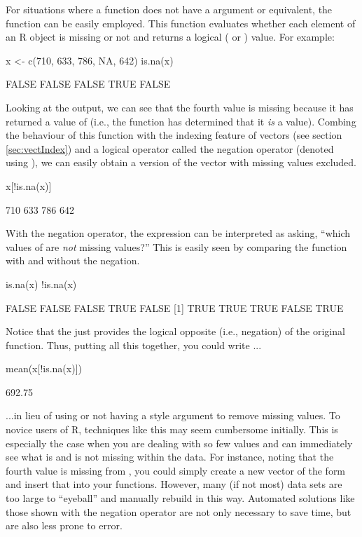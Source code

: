 For situations where a function does not have a  argument or equivalent, the function  can be easily employed. This function evaluates whether each element of an R object is missing or not and returns a logical ( or ) value. For example:

\begin{inR}
x <- c(710, 633, 786, NA, 642)
is.na(x)
\end{inR}
\begin{outR}
[1] FALSE FALSE FALSE TRUE FALSE
\end{outR}

Looking at the output, we can see that the fourth value is missing because it has returned a value of  (i.e., the function has determined that it \textit{is} a  value).  Combing the behaviour of this function with the indexing feature of vectors (see section \ref{sec:vectIndex}) and a \gls{logical operator} called the \gls{negation operator} (denoted using \R{!}), we can easily obtain a version of the vector with missing values excluded.

\begin{inR}
x[!is.na(x)]
\end{inR}
\begin{outR}
[1] 710 633 786 642
\end{outR}

With the negation operator, the expression  can be interpreted as asking, ``which values of  are \textit{not} missing values?''  This is easily seen by comparing the  function with and without the negation.

\begin{inR}
is.na(x)
!is.na(x)
\end{inR}
\begin{outR}
[1] FALSE FALSE FALSE  TRUE FALSE
[1]  TRUE  TRUE  TRUE FALSE  TRUE
\end{outR}

Notice that the \R{!} just provides the logical opposite (i.e., negation) of the original function.  Thus, putting all this together, you could write ...

\begin{inR}
mean(x[!is.na(x)])
\end{inR}
\begin{outR}
[1] 692.75
\end{outR}

...in lieu of using or not having a  style argument to remove missing values.  To novice users of R, techniques like this may seem cumbersome initially.  This is especially the case when you are dealing with so few values and can immediately see what is and is not missing within the data. For instance, noting that the fourth value is missing from , you could simply create a new vector of the form  and insert that into your functions. However, many (if not most) data sets are too large to ``eyeball'' and manually rebuild in this way. Automated solutions like those shown with the negation operator are not only necessary to save time, but are also less prone to error.




